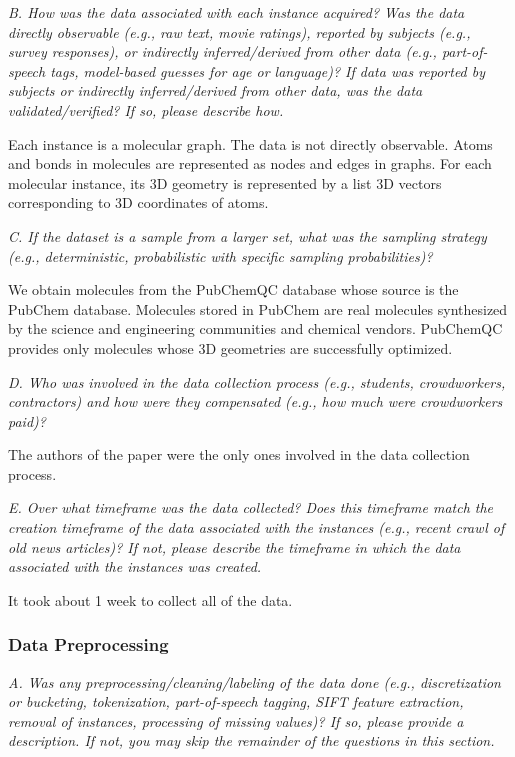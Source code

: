 \documentclass{article}
\begin{document}
\textit{B. How was the data associated with each instance acquired? Was the data directly observable (e.g., raw text, movie ratings), reported by subjects (e.g., survey responses), or indirectly inferred/derived from other data (e.g., part-of- speech tags, model-based guesses for age or language)? If data was reported by subjects or indirectly inferred/derived from other data, was the data validated/verified? If so, please describe how.}

Each instance is a molecular graph. The data is not directly observable. Atoms and bonds in molecules are represented as nodes and edges in graphs. For each molecular instance, its 3D geometry is represented by a list 3D vectors corresponding to 3D coordinates of atoms.

\textit{C. If the dataset is a sample from a larger set, what was the sampling strategy (e.g., deterministic, probabilistic with specific sampling probabilities)?}

We obtain molecules from the PubChemQC database whose source is the PubChem database. Molecules stored in PubChem are real molecules synthesized by the science and engineering communities and chemical vendors. PubChemQC provides only molecules whose 3D geometries are successfully optimized. 

\textit{D. Who was involved in the data collection process (e.g., students, crowdworkers, contractors) and how were they compensated (e.g., how much were crowdworkers paid)?}

The authors of the paper were the only ones involved in the data collection process.

\textit{E. Over what timeframe was the data collected? Does this timeframe match the creation timeframe of the data associated with the instances (e.g., recent crawl of old news articles)? If not, please describe the timeframe in which the data associated with the instances was created.}

It took about 1 week to collect all of the data.


\subsubsection{Data Preprocessing}

\textit{A. Was any preprocessing/cleaning/labeling of the data done (e.g., discretization or bucketing, tokenization, part-of-speech tagging, SIFT feature extraction, removal of instances, processing of missing values)? If so, please provide a description. If not, you may skip the remainder of the questions in this section.}
\end{document}
